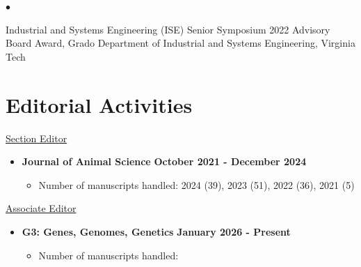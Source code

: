 \documentclass[margin,line,10pt]{res}
\newenvironment{list2}{
  \begin{list}{$\bullet$}{%
      \setlength{\itemsep}{0in}
      \setlength{\parsep}{0in} \setlength{\parskip}{0in}
      \setlength{\topsep}{0in} \setlength{\partopsep}{0in} 
      \setlength{\leftmargin}{0.2in}}}{\end{list}}
\begin{document}
\begin{resume}
\vspace{0.2cm}

\section{}
\begin{list2}
  \item Industrial and Systems Engineering (ISE) Senior Symposium 2022 Advisory Board Award, Grado Department of Industrial and Systems Engineering, Virginia Tech 
\end{list2}



\vspace{0.5cm}
\section{\sc Editorial Activities}



\vspace{0.3cm}

\underline{Section Editor}
\vspace{0.2cm}
\begin{itemize}
  \item {\bf Journal of Animal Science} \hfill {\bf October 2021 - December 2024}
    \begin{itemize}
      \item Number of manuscripts handled: 2024 (39), 2023 (51), 2022 (36), 2021 (5)
    \end{itemize}
  \end{itemize}



\underline{Associate Editor}
\vspace{0.2cm}


  

\begin{itemize}
  \item {\bf G3: Genes, Genomes, Genetics} \hfill {\bf January 2026 - Present}
    \begin{itemize}
      \item Number of manuscripts handled: 
    \end{itemize}
  \end{itemize}
  

\end{resume}
\end{document}
